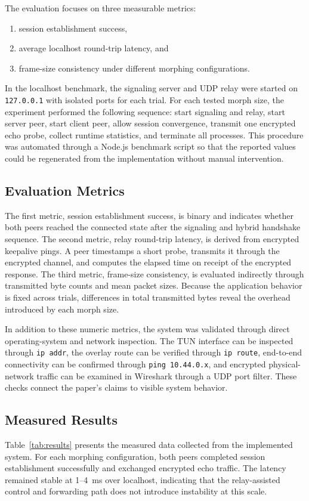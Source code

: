 \documentclass[conference]{IEEEtran}
\begin{document}
The evaluation focuses on three measurable metrics:
\begin{enumerate}[leftmargin=*,itemsep=0pt,topsep=2pt]
\item session establishment success,
\item average localhost round-trip latency, and
\item frame-size consistency under different morphing configurations.
\end{enumerate}

In the localhost benchmark, the signaling server and UDP relay were started on \texttt{127.0.0.1} with isolated ports for each trial. For each tested morph size, the experiment performed the following sequence: start signaling and relay, start server peer, start client peer, allow session convergence, transmit one encrypted echo probe, collect runtime statistics, and terminate all processes. This procedure was automated through a Node.js benchmark script so that the reported values could be regenerated from the implementation without manual intervention.

\subsection{Evaluation Metrics}
The first metric, session establishment success, is binary and indicates whether both peers reached the connected state after the signaling and hybrid handshake sequence. The second metric, relay round-trip latency, is derived from encrypted keepalive pings. A peer timestamps a short probe, transmits it through the encrypted channel, and computes the elapsed time on receipt of the encrypted response. The third metric, frame-size consistency, is evaluated indirectly through transmitted byte counts and mean packet sizes. Because the application behavior is fixed across trials, differences in total transmitted bytes reveal the overhead introduced by each morph size.

In addition to these numeric metrics, the system was validated through direct operating-system and network inspection. The TUN interface can be inspected through \texttt{ip addr}, the overlay route can be verified through \texttt{ip route}, end-to-end connectivity can be confirmed through \texttt{ping 10.44.0.x}, and encrypted physical-network traffic can be examined in Wireshark through a UDP port filter. These checks connect the paper's claims to visible system behavior.

\subsection{Measured Results}
Table~\ref{tab:results} presents the measured data collected from the implemented system. For each morphing configuration, both peers completed session establishment successfully and exchanged encrypted echo traffic. The latency remained stable at 1--4~ms over localhost, indicating that the relay-assisted control and forwarding path does not introduce instability at this scale.
\end{document}
